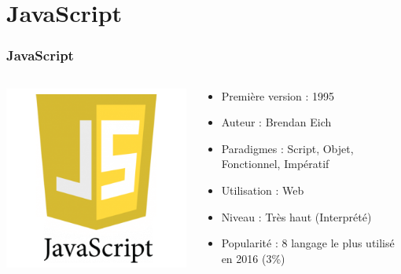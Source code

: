\documentclass{beamer}
\begin{document}
	\section{JavaScript}
	\begin{frame}
	\frametitle{JavaScript}
	\begin{columns}

	\begin{column}{3cm}
				\includegraphics[scale=0.3]{javascript_logo.png}
	\end{column}

	\begin{column}{7cm}
		\begin{itemize}
			\item Première version : 1995
			\item Auteur : Brendan Eich
			\item Paradigmes : Script, Objet, Fonctionnel, Impératif
			\item Utilisation : Web
			\item Niveau : Très haut (Interprété)
			\item Popularité : 8 langage le plus utilisé en 2016 (3\%)
		\end{itemize}
	\end{column}
	\end{columns}

	\end{frame}
\end{document}
